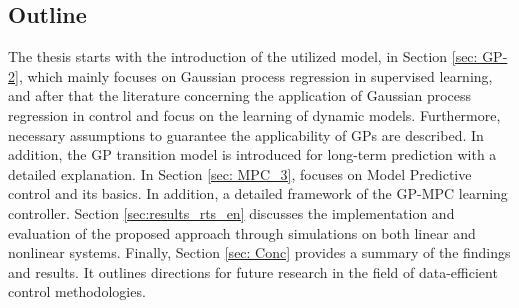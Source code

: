 \subsection{Outline}
The thesis starts with the introduction of the utilized model, in Section \ref{sec: GP-2}, which mainly focuses on Gaussian process regression in supervised learning, and after that the literature concerning the application of Gaussian process regression in control and focus on the learning of dynamic models. Furthermore, necessary assumptions to guarantee the applicability of GPs are described. In addition, the GP transition model is introduced for long-term prediction with a detailed explanation. In Section \ref{sec: MPC_3}, focuses on Model Predictive control and its basics. In addition, a detailed framework of the GP-MPC learning controller. Section \ref{sec:results_rts_en} discusses the implementation and evaluation of the proposed approach through simulations on both linear and nonlinear systems. Finally, Section \ref{sec: Conc} provides a summary of the findings and results. It outlines directions for future research in the field of data-efficient control methodologies.








